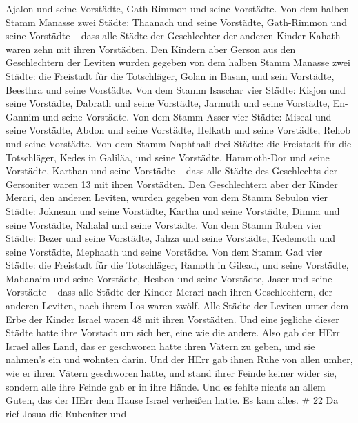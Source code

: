  Ajalon und seine Vorstädte, Gath-Rimmon und seine
Vorstädte.  Von dem halben Stamm Manasse zwei Städte:
Thaanach und seine Vorstädte, Gath-Rimmon und seine Vorstädte --
 dass alle Städte der Geschlechter der anderen Kinder
Kahath waren zehn mit ihren Vorstädten.  Den Kindern aber
Gerson aus den Geschlechtern der Leviten wurden gegeben von dem halben
Stamm Manasse zwei Städte: die Freistadt für die Totschläger, Golan in
Basan, und sein Vorstädte, Beesthra und seine Vorstädte. 
Von dem Stamm Isaschar vier Städte: Kisjon und seine Vorstädte, Dabrath
und seine Vorstädte,  Jarmuth und seine Vorstädte,
En-Gannim und seine Vorstädte.  Von dem Stamm Asser vier
Städte: Miseal und seine Vorstädte, Abdon und seine Vorstädte,
 Helkath und seine Vorstädte, Rehob und seine Vorstädte.
 Von dem Stamm Naphthali drei Städte: die Freistadt für die
Totschläger, Kedes in Galiläa, und seine Vorstädte, Hammoth-Dor und
seine Vorstädte, Karthan und seine Vorstädte --  dass alle
Städte des Geschlechts der Gersoniter waren 13 mit ihren Vorstädten.
 Den Geschlechtern aber der Kinder Merari, den anderen
Leviten, wurden gegeben von dem Stamm Sebulon vier Städte: Jokneam und
seine Vorstädte, Kartha und seine Vorstädte,  Dimna und
seine Vorstädte, Nahalal und seine Vorstädte.  Von dem
Stamm Ruben vier Städte: Bezer und seine Vorstädte, Jahza und seine
Vorstädte,  Kedemoth und seine Vorstädte, Mephaath und
seine Vorstädte.  Von dem Stamm Gad vier Städte: die
Freistadt für die Totschläger, Ramoth in Gilead, und seine Vorstädte,
 Mahanaim und seine Vorstädte, Hesbon und seine Vorstädte,
Jaser und seine Vorstädte --  dass alle Städte der Kinder
Merari nach ihren Geschlechtern, der anderen Leviten, nach ihrem Los
waren zwölf.  Alle Städte der Leviten unter dem Erbe der
Kinder Israel waren 48 mit ihren Vorstädten.  Und eine
jegliche dieser Städte hatte ihre Vorstadt um sich her, eine wie die
andere.  Also gab der HErr Israel alles Land, das er
geschworen hatte ihren Vätern zu geben, und sie nahmen's ein und wohnten
darin.  Und der HErr gab ihnen Ruhe von allen umher, wie er
ihren Vätern geschworen hatte, und stand ihrer Feinde keiner wider sie,
sondern alle ihre Feinde gab er in ihre Hände.  Und es
fehlte nichts an allem Guten, das der HErr dem Hause Israel verheißen
hatte. Es kam alles. \# 22  Da rief Josua die Rubeniter und
